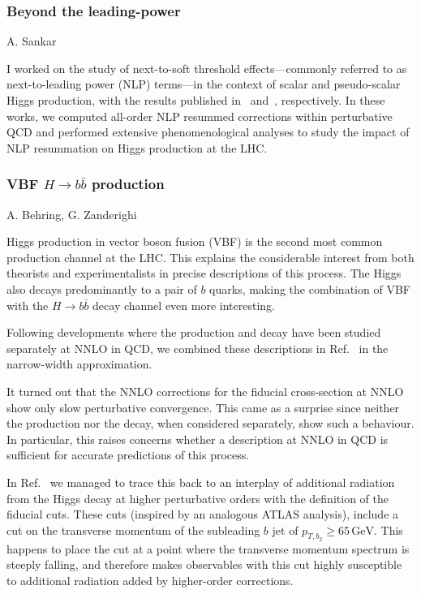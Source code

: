 \documentclass{FBR_Bericht_2025}
\begin{document}
\begin{refsection}
\subsubsection{Beyond the leading-power}
\begin{Namen}
A. Sankar
\end{Namen}
%
I worked on the study of next-to-soft threshold effects—commonly referred to as next-to-leading power (NLP) terms—in the context of scalar and pseudo-scalar Higgs production, with the results published in~\cite{Das:2024pac} and~\cite{Ravindran:2023qae}, respectively. In these works, we computed all-order NLP resummed corrections within perturbative QCD and performed extensive phenomenological analyses to study the impact of NLP resummation on Higgs production at the LHC.
%
\subsubsection{VBF $H\rightarrow b\bar{b}$ production}
\begin{Namen}
A. Behring, G. Zanderighi
\end{Namen}
Higgs production in vector boson fusion (VBF) is the second most common
production channel at the LHC. This explains the considerable interest from
both theorists and experimentalists in precise descriptions of this process.
The Higgs also decays predominantly to a pair of $b$ quarks, making the
combination of VBF with the $H \to b\bar{b}$ decay channel even more
interesting.

Following developments where the production \cite{Asteriadis:2021gpd} and decay
\cite{Behring:2019oci} have been studied separately at NNLO in QCD, we combined
these descriptions in Ref.~\cite{Asteriadis:2024nbg} in the narrow-width
approximation.

It turned out that the NNLO corrections for the fiducial cross-section at NNLO
show only slow perturbative convergence. This came as a surprise since neither
the production nor the decay, when considered separately, show such a
behaviour. In particular, this raises concerns whether a description at NNLO in
QCD is sufficient for accurate predictions of this process.

In Ref.~\cite{steriadis:2024nbg} we managed to trace this back to an interplay
of additional radiation from the Higgs decay at higher perturbative orders with
the definition of the fiducial cuts. These cuts (inspired by an analogous ATLAS
analysis), include a cut on the transverse momentum of the subleading $b$ jet
of $p_{T,b_2} \geq 65\,\mathrm{GeV}$. This happens to place the cut at a point
where the transverse momentum spectrum is steeply falling, and therefore makes
observables with this cut highly susceptible to additional radiation added by
higher-order corrections.


\end{refsection}
\end{document}
